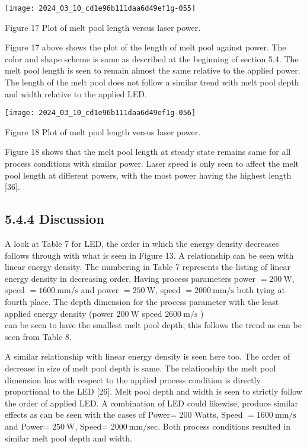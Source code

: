 \documentclass[10pt]{article}
\begin{document}
\begin{center}
\texttt{[image: 2024\_03\_10\_cd1e96b111daa6d49ef1g-055]}
\end{center}

Figure 17 Plot of melt pool length versus laser power.

Figure 17 above shows the plot of the length of melt pool against power. The color and shape scheme is same as described at the beginning of section 5.4. The melt pool length is seen to remain almost the same relative to the applied power. The length of the melt pool does not follow a similar trend with melt pool depth and width relative to the applied LED.

\begin{center}
\texttt{[image: 2024\_03\_10\_cd1e96b111daa6d49ef1g-056]}
\end{center}

Figure 18 Plot of melt pool length versus laser power.

Figure 18 shows that the melt pool length at steady state remains same for all process conditions with similar power. Laser speed is only seen to affect the melt pool length at different powers, with the most power having the highest length [36].

\subsection*{5.4.4 Discussion}
A look at Table 7 for LED, the order in which the energy density decreases follows through with what is seen in Figure 13. A relationship can be seen with linear energy density. The numbering in Table 7 represents the listing of linear energy density in decreasing order. Having process parameters power $=200 \mathrm{~W}$, speed $=1600 \mathrm{~mm} / \mathrm{s}$ and power $=250 \mathrm{~W}$, speed $=2000 \mathrm{~mm} / \mathrm{s}$ both tying at fourth place. The depth dimension for the process parameter with the least applied energy density (power $200 \mathrm{~W}$ speed $2600 \mathrm{~m} / \mathrm{s}$ )\\
can be seen to have the smallest melt pool depth; this follows the trend as can be seen from Table 8.

A similar relationship with linear energy density is seen here too. The order of decrease in size of melt pool depth is same. The relationship the melt pool dimension has with respect to the applied process condition is directly proportional to the LED [26]. Melt pool depth and width is seen to strictly follow the order of applied LED. A combination of LED could likewise, produce similar effects as can be seen with the cases of Power= 200 Watts, Speed $=1600 \mathrm{~mm} / \mathrm{s}$ and Power= $250 \mathrm{~W}$, Speed= $2000 \mathrm{~mm} / \mathrm{sec}$. Both process conditions resulted in similar melt pool depth and width.
\end{document}
